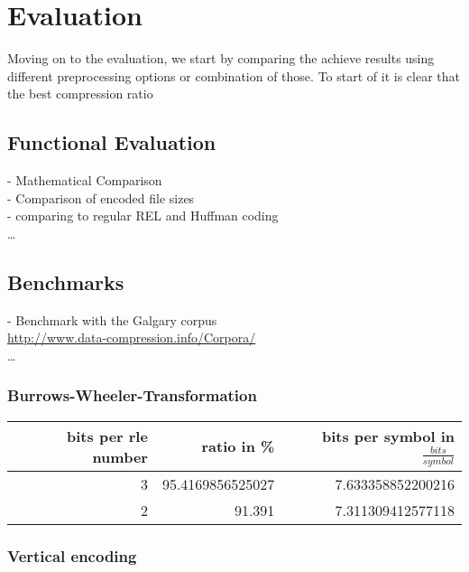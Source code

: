 
\chapter{Evaluation}
\label{ch:Evaluation}
Moving on to the evaluation, we start by comparing the achieve results using different preprocessing options or combination of those. To start of it is clear that the best compression ratio 

\section{Functional Evaluation}
\label{ch:Evaluation:sec:Functional Evaluation}
- Mathematical Comparison\\
- Comparison of encoded file sizes\\
- comparing to regular REL and Huffman coding\\
\ldots

\section{Benchmarks}
\label{ch:Evaluation:sec:Benchmarks}
- Benchmark with the Galgary corpus\\
\url{http://www.data-compression.info/Corpora/} \\
\ldots

\subsection{Burrows-Wheeler-Transformation}

\par{
\begin{center}
	\begin{tabular}[p]{r|r|r}
		\label{tab:t6 run length eval bwt}
		
		bits per rle number & ratio in \% & bits per symbol in $\frac{bits}{symbol}$\\
		\hline
		3 & 95.4169856525027 & 7.633358852200216\\
		2 & 91.391 & 7.311309412577118 \\
	\end{tabular}
\end{center}
}


\subsection{Vertical encoding}
\par{


}

